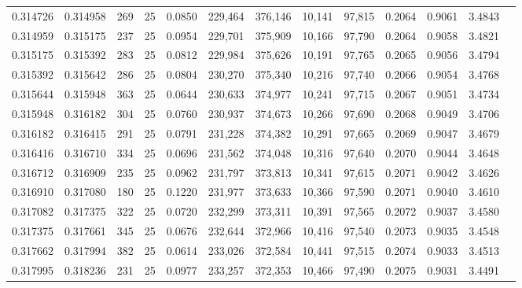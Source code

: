 \begin{tabular}{rrrrrrrrrrrrr}
0.314726 & 0.314958 &   269 &  25 &                                     0.0850 & 229,464 & 376,146 &  10,141 &  97,815 & 0.2064 & 0.9061 & 3.4843 \\
0.314959 & 0.315175 &   237 &  25 &                                     0.0954 & 229,701 & 375,909 &  10,166 &  97,790 & 0.2064 & 0.9058 & 3.4821 \\
0.315175 & 0.315392 &   283 &  25 &                                     0.0812 & 229,984 & 375,626 &  10,191 &  97,765 & 0.2065 & 0.9056 & 3.4794 \\
0.315392 & 0.315642 &   286 &  25 &                                     0.0804 & 230,270 & 375,340 &  10,216 &  97,740 & 0.2066 & 0.9054 & 3.4768 \\
0.315644 & 0.315948 &   363 &  25 &                                     0.0644 & 230,633 & 374,977 &  10,241 &  97,715 & 0.2067 & 0.9051 & 3.4734 \\
0.315948 & 0.316182 &   304 &  25 &                                     0.0760 & 230,937 & 374,673 &  10,266 &  97,690 & 0.2068 & 0.9049 & 3.4706 \\
0.316182 & 0.316415 &   291 &  25 &                                     0.0791 & 231,228 & 374,382 &  10,291 &  97,665 & 0.2069 & 0.9047 & 3.4679 \\
0.316416 & 0.316710 &   334 &  25 &                                     0.0696 & 231,562 & 374,048 &  10,316 &  97,640 & 0.2070 & 0.9044 & 3.4648 \\
0.316712 & 0.316909 &   235 &  25 &                                     0.0962 & 231,797 & 373,813 &  10,341 &  97,615 & 0.2071 & 0.9042 & 3.4626 \\
0.316910 & 0.317080 &   180 &  25 &                                     0.1220 & 231,977 & 373,633 &  10,366 &  97,590 & 0.2071 & 0.9040 & 3.4610 \\
0.317082 & 0.317375 &   322 &  25 &                                     0.0720 & 232,299 & 373,311 &  10,391 &  97,565 & 0.2072 & 0.9037 & 3.4580 \\
0.317375 & 0.317661 &   345 &  25 &                                     0.0676 & 232,644 & 372,966 &  10,416 &  97,540 & 0.2073 & 0.9035 & 3.4548 \\
0.317662 & 0.317994 &   382 &  25 &                                     0.0614 & 233,026 & 372,584 &  10,441 &  97,515 & 0.2074 & 0.9033 & 3.4513 \\
0.317995 & 0.318236 &   231 &  25 &                                     0.0977 & 233,257 & 372,353 &  10,466 &  97,490 & 0.2075 & 0.9031 & 3.4491 \\

\end{tabular}
